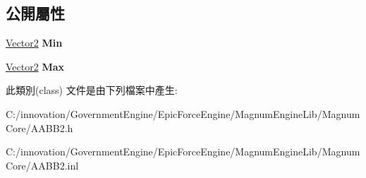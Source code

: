 \subsection*{公開屬性}
\begin{DoxyCompactItemize}
\item 
\hyperlink{class_i_dream_sky_1_1_vector2}{Vector2} {\bfseries Min}\hypertarget{class_i_dream_sky_1_1_a_a_b_b2_a9a7490629ca054e186463a985f747778}{}\label{class_i_dream_sky_1_1_a_a_b_b2_a9a7490629ca054e186463a985f747778}

\item 
\hyperlink{class_i_dream_sky_1_1_vector2}{Vector2} {\bfseries Max}\hypertarget{class_i_dream_sky_1_1_a_a_b_b2_a71bf1f89103464c45708a356b985dc5f}{}\label{class_i_dream_sky_1_1_a_a_b_b2_a71bf1f89103464c45708a356b985dc5f}

\end{DoxyCompactItemize}


此類別(class) 文件是由下列檔案中產生\+:\begin{DoxyCompactItemize}
\item 
C\+:/innovation/\+Government\+Engine/\+Epic\+Force\+Engine/\+Magnum\+Engine\+Lib/\+Magnum\+Core/A\+A\+B\+B2.\+h\item 
C\+:/innovation/\+Government\+Engine/\+Epic\+Force\+Engine/\+Magnum\+Engine\+Lib/\+Magnum\+Core/A\+A\+B\+B2.\+inl\end{DoxyCompactItemize}
